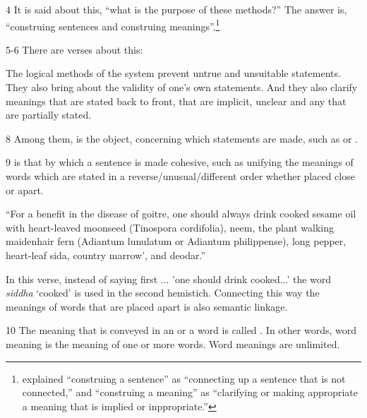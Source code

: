 \begin{translation}
\item [4] It is said about this, “what is the purpose of these methods?”
The answer is, “construing sentences and construing
meanings”.\footnote{ explained “construing a
    sentence” as “connecting up a sentence that is not connected,” and
    “construing a meaning” as “clarifying  or making appropriate a meaning
    that is implied or inppropriate.”}

\item [5-6] There are  verses about this:
  
\begin{sloka}
The logical methods of the system prevent untrue and unsuitable
statements. They also bring about the validity of one’s own
statements.  And they also clarify meanings that are stated back to
front, that are implicit, unclear and any that are partially stated.
\end{sloka}

\item [8] Among them,  is the object, concerning which 
statements are made, such as  or . 

\item [9]  is that by which a sentence is made 
cohesive, such as unifying the meanings of words which are stated in a 
reverse/unusual/different order whether placed close or apart.

``For a benefit in the disease of goitre, one should always drink cooked sesame 
oil with heart-leaved moonseed (Tinospora cordifolia), neem, the plant walking 
maidenhair fern (Adiantum lunulatum or Adiantum philippense), long pepper, 
heart-leaf sida, country marrow', and deodar.'' 

In this verse, instead of saying first ... 'one should drink 
cooked...' the word \emph{siddha} `cooked' is used in the second hemistich. 
Connecting this way the meanings of words that are placed apart is also 
semantic linkage.  
 

\item [10] The meaning that is conveyed in an  or a word is 
called . In other words, word meaning is the 
meaning of one or more words. Word meanings are unlimited. 


\end{translation}
